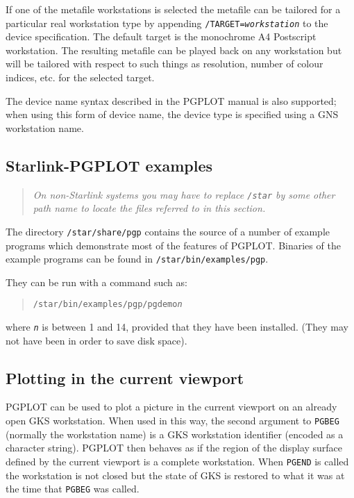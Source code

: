 \documentclass[twoside,11pt]{article}
\newcommand{\xref}[3]{#1}
\newcommand{\xlabel}[1]{}
\renewcommand{\_}{\texttt{\symbol{95}}}
\begin{document}
If one of the metafile workstations is selected the metafile can be
tailored for a particular real workstation type by appending
\texttt{/TARGET=\emph{workstation}} to the device specification.  The
default target is the monochrome A4 Postscript workstation. The
resulting metafile can be played back on any workstation but will be
tailored with respect to such things as resolution, number of colour
indices, etc. for the selected target.

The device name syntax described in the PGPLOT manual is also
supported; when using this form of device name, the device type is
specified using a GNS workstation name.

\subsection{\xlabel{starlink-pgplot_examples}Starlink-PGPLOT examples}
\label{starlink-pgplot_examples}

\begin{quote}
\emph{ On non-Starlink systems you may have to replace \texttt{/star} by 
some other path name to locate the files referred to in this section.}
\end{quote}

The directory \texttt{/star/share/pgp} contains the source of a
number of example programs which demonstrate most of the features of
PGPLOT.  Binaries of the example programs can be found in
\texttt{/star/bin/examples/pgp}.

They can be run with a command such as:

\begin{quote}
\texttt{/star/bin/examples/pgp/pgdemo{\emph{n}}}
\end{quote}

where \texttt{\emph{n}} is between 1 and 14, provided that they have
been installed.  (They may not have been in order to save disk space).

\subsection{\xlabel{plotting_in_the_current_viewport} %
Plotting in the current viewport}
\label{plotting_in_the_current_viewport}
\label{viewport}

PGPLOT can be used to plot a picture in the current viewport on an
already open GKS workstation. When used in this way, the second
argument to \xref{\texttt{PGBEG}}{sun15}{PGBEG} (normally the workstation
name) is a GKS workstation identifier (encoded as a character string).
PGPLOT then behaves as if the region of the display surface defined by
the current viewport is a complete workstation.  When
\xref{\texttt{PGEND}}{sun15}{PGEND} is called the workstation is not closed
but the state of GKS is restored to what it was at the time that
\texttt{PGBEG} was called.
\end{document}
